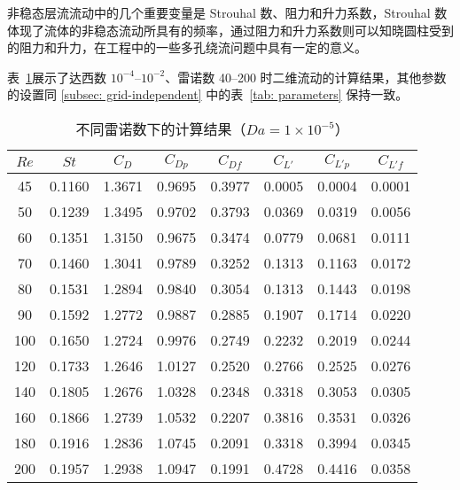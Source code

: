 非稳态层流流动中的几个重要变量是 Strouhal 数、阻力和升力系数，Strouhal 数体现了流体的非稳态流动所具有的频率，通过阻力和升力系数则可以知晓圆柱受到的阻力和升力，在工程中的一些多孔绕流问题中具有一定的意义。

表~\ref{tab: results-1e-5}展示了达西数 $10^{-4}$--$10^{-2}$、雷诺数 40--200 时二维流动的计算结果，其他参数的设置同 \ref{subsec: grid-independent} 中的表~\ref{tab: parameters} 保持一致。

\begin{table}[ht]
	\caption{不同雷诺数下的计算结果（$Da=1\times 10^{-5}$）}\label{tab: results-1e-5}
	\vspace{.5em}\centering\wuhao
	\begin{tabular}{*{8}{c}}
		\toprule[1.5pt]
		$Re$ & $St$ & $C_D$ & $C_{Dp}$ & $C_{Df}$ & $C_{L'}$ & $C_{L'p}$ & $C_{L'f}$ \\
		\midrule[1pt]
		45  & 0.1160 & 1.3671 & 0.9695 & 0.3977 & 0.0005 & 0.0004 & 0.0001 \\
		50  & 0.1239 & 1.3495 & 0.9702 & 0.3793 & 0.0369 & 0.0319 &	0.0056 \\
		60  & 0.1351 & 1.3150 & 0.9675 & 0.3474 & 0.0779 & 0.0681 & 0.0111 \\
		70  & 0.1460 & 1.3041 & 0.9789 & 0.3252 & 0.1313 & 0.1163 &	0.0172 \\
		80  & 0.1531 & 1.2894 &	0.9840 & 0.3054 & 0.1313 & 0.1443 &	0.0198 \\
		90  & 0.1592 & 1.2772 &	0.9887 & 0.2885 & 0.1907 & 0.1714 &	0.0220 \\
		100 & 0.1650 & 1.2724 &	0.9976 & 0.2749 & 0.2232 & 0.2019 &	0.0244 \\
		120 & 0.1733 & 1.2646 &	1.0127 & 0.2520 & 0.2766 & 0.2525 &	0.0276 \\
		140 & 0.1805 & 1.2676 &	1.0328 & 0.2348 & 0.3318 & 0.3053 &	0.0305 \\
		160 & 0.1866 & 1.2739 &	1.0532 & 0.2207 & 0.3816 & 0.3531 &	0.0326 \\
		180 & 0.1916 & 1.2836 &	1.0745 & 0.2091 & 0.3318 & 0.3994 &	0.0345 \\
		200 & 0.1957 & 1.2938 &	1.0947 & 0.1991 & 0.4728 & 0.4416 &	0.0358 \\
		\bottomrule[1.5pt]
	\end{tabular}
\end{table}


